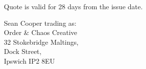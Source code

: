 \documentclass[11pt,a4paper]{letter}
\begin{document}
    \fontsize{7pt}{9pt}\selectfont
    {\semibold Quote is valid for 28 days from the issue date.}\\
    \vspace*{\fill}
    \begin{center}
    {\fontsize{7pt}{9pt}\selectfont
    Sean Cooper trading as:\\
    {\semiboldit Order \& Chaos Creative}\\
    32 Stokebridge Maltings,\\
    Dock Street,\\
    Ipswich IP2 8EU\\}
    \end{center}
\end{document}
